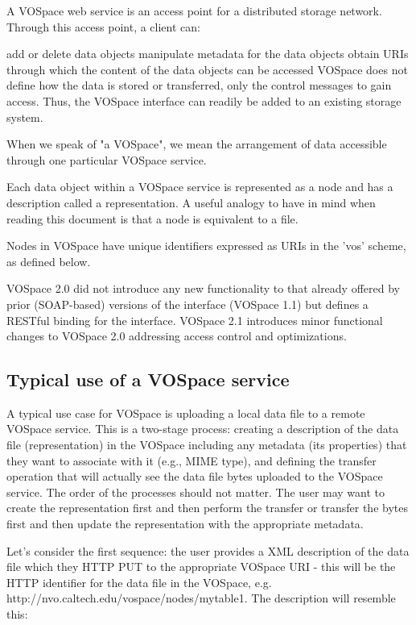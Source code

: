 \documentclass[11pt,a4paper]{ivoa}
\begin{document}
A VOSpace web service is an access point for a distributed storage network. Through this access point, a client can:

add or delete data objects
manipulate metadata for the data objects
obtain URIs through which the content of the data objects can be accessed
VOSpace does not define how the data is stored or transferred, only the control messages to gain access. Thus, the VOSpace interface can readily be added to an existing storage system.

When we speak of "a VOSpace", we mean the arrangement of data accessible through one particular VOSpace service.

Each data object within a VOSpace service is represented as a node and has a description called a representation. A useful analogy to have in mind when reading this document is that a node is equivalent to a file.

Nodes in VOSpace have unique identifiers expressed as URIs in the 'vos' scheme, as defined below.

VOSpace 2.0 did not introduce any new functionality to that already offered by prior (SOAP-based) versions of the interface (VOSpace 1.1) but defines a RESTful binding for the interface. VOSpace 2.1 introduces minor functional changes to VOSpace 2.0 addressing access control and optimizations.

\subsection{Typical use of a VOSpace service}
A typical use case for VOSpace is uploading a local data file to a remote VOSpace service. This is a two-stage process: creating a description of the data file (representation) in the VOSpace including any metadata (its properties) that they want to associate with it (e.g., MIME type), and defining the transfer operation that will actually see the data file bytes uploaded to the VOSpace service. The order of the processes should not matter. The user may want to create the representation first and then perform the transfer or transfer the bytes first and then update the representation with the appropriate metadata.

Let's consider the first sequence: the user provides a XML description of the data file which they HTTP PUT to the appropriate VOSpace URI - this will be the HTTP identifier for the data file in the VOSpace, e.g. http://nvo.caltech.edu/vospace/nodes/mytable1. The description will resemble this:
\end{document}
